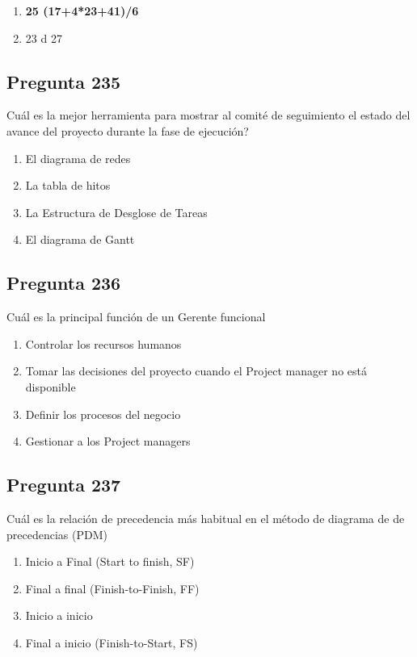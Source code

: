 \documentclass[11pt,a4paper]{article}
\begin{document}
\begin{enumerate}[label=\alph*)]
  \item \textbf{25 (17+4*23+41)/6}
  \item 23 d 27
\end{enumerate}

\subsection*{Pregunta 235}
Cuál es la mejor herramienta para mostrar al comité de seguimiento el estado del avance del proyecto durante la fase de ejecución?

\begin{enumerate}[label=\alph*)]
  \item El diagrama de redes
  \item La tabla de hitos
  \item La Estructura de Desglose de Tareas
  \item El diagrama de Gantt
\end{enumerate}

\subsection*{Pregunta 236}
Cuál es la principal función de un Gerente funcional

\begin{enumerate}[label=\alph*)]
  \item Controlar los recursos humanos
  \item Tomar las decisiones del proyecto cuando el Project manager no está disponible
  \item Definir los procesos del negocio
  \item Gestionar a los Project managers
\end{enumerate}

\subsection*{Pregunta 237}
Cuál es la relación de precedencia más habitual en el método de diagrama de de precedencias (PDM)

\begin{enumerate}[label=\alph*)]
  \item Inicio a Final (Start to finish, SF)
  \item Final a final (Finish-to-Finish, FF)
  \item Inicio a inicio
  \item Final a inicio (Finish-to-Start, FS)
\end{enumerate}
\end{document}
